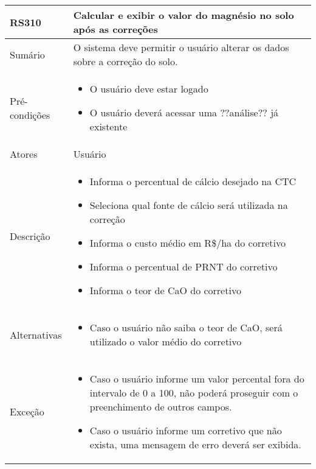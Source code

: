 \begin{quadro}[H]
    \begin{tabular}{|p{3cm}|p{11cm}|}
        \hline
        \textbf{RS310} & \textbf{Calcular e exibir o valor do magnésio no solo após as correções}     \\
        \hline
        Sumário        & O sistema deve permitir o usuário alterar os dados sobre a correção do solo. \\
        \hline
        Pré-condições  & \begin{itemize}
            \item O usuário deve estar logado
            \item O usuário deverá acessar uma ??análise?? já existente
        \end{itemize}                                                   \\
        \hline
        Atores         & Usuário                                                                      \\
        \hline
        Descrição      &
        \begin{itemize}
            \item Informa o percentual de cálcio desejado na CTC
            \item Seleciona qual fonte de cálcio será utilizada na correção
            \item Informa o custo médio em R\$/ha do corretivo
            \item Informa o percentual de PRNT do corretivo
            \item Informa o teor de CaO do corretivo
        \end{itemize}                                                                    \\
        \hline
        Alternativas   &
        \begin{itemize}
            \item Caso o usuário não saiba o teor de CaO, será utilizado o valor médio do corretivo
        \end{itemize}                                                                    \\
        \hline
        Exceção        &
        \begin{itemize}
            \item Caso o usuário informe um valor percental fora do intervalo de 0 a 100, não poderá proseguir com o preenchimento de outros campos.
            \item Caso o usuário informe um corretivo que não exista, uma mensagem de erro deverá ser exibida.
        \end{itemize}                                                                    \\
        \hline
    \end{tabular}
\end{quadro}

